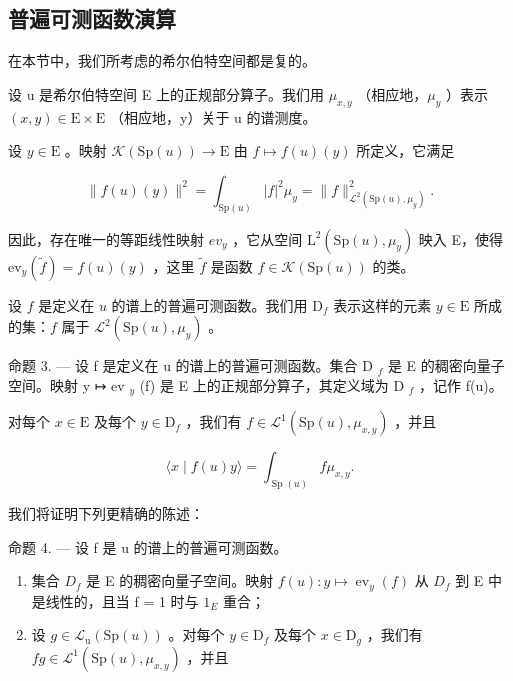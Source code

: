 \subsection{普遍可测函数演算}

在本节中，我们所考虑的希尔伯特空间都是复的。

设 u 是希尔伯特空间 E 上的正规部分算子。我们用 \(\mu_{x,y}\) （相应地，\(\mu_{y}\) ）表示 \((x,y)\in\mathrm{E}\times\mathrm{E}\) （相应地，y）关于 u 的谱测度。

设 \(y \in \mathrm{E}\) 。映射 \(\mathcal{K}(\mathrm{Sp}(u)) \to \mathrm{E}\) 由 \(f \mapsto f(u)(y)\) 所定义，它满足

\[
\| f (u) (y) \| ^ {2} = \int_ {\mathrm{Sp} (u)} | f | ^ {2} \mu_ {y} = \| f \| _ {\mathcal {L} ^ {2} (\mathrm{Sp} (u), \mu_ {y})} ^ {2}.
\]

因此，存在唯一的等距线性映射 \(ev_{y}\) ，它从空间 \(\mathrm{L}^{2}(\mathrm{Sp}(u),\mu_{y})\) 映入 E，使得 \(\mathrm{ev}_{y}(\widetilde{f})=f(u)(y)\) ，这里 \(\widetilde{f}\) 是函数 \(f\in\mathcal{K}(\mathrm{Sp}(u))\) 的类。

设 \(f\) 是定义在 \(u\) 的谱上的普遍可测函数。我们用 \(\mathrm{D}_{f}\) 表示这样的元素 \(y \in \mathrm{E}\) 所成的集：\(f\) 属于 \(\mathcal{L}^{2}(\mathrm{Sp}(u), \mu_{y})\) 。

命题 3. --- 设 f 是定义在 u 的谱上的普遍可测函数。集合 D \(_{f}\) 是 E 的稠密向量子空间。映射 y ↦ ev \(_{y}\) (f) 是 E 上的正规部分算子，其定义域为 D \(_{f}\) ，记作 f(u)。

对每个 \(x \in \mathrm{E}\) 及每个 \(y \in \mathrm{D}_f\) ，我们有 \(f \in \mathcal{L}^1(\mathrm{Sp}(u), \mu_{x,y})\) ，并且

\[
\langle x \mid f (u) y \rangle = \int_ {\operatorname{Sp} (u)} f \mu_ {x, y}.\tag{6}
\]

我们将证明下列更精确的陈述：

命题 4. --- 设 f 是 u 的谱上的普遍可测函数。

\begin{enumerate}
\def\labelenumi{\alph{enumi})}
\item
  集合 \(D_{f}\) 是 E 的稠密向量子空间。映射 \(f(u): y \mapsto \operatorname{ev}_{y}(f)\) 从 \(D_{f}\) 到 E 中是线性的，且当 f = 1 时与 \(1_{E}\) 重合；
\item
  设 \(g \in \mathcal{L}_{\mathrm{u}}(\mathrm{Sp}(u))\) 。对每个 \(y \in \mathrm{D}_f\) 及每个 \(x \in \mathrm{D}_g\) ，我们有 \(fg \in \mathcal{L}^1(\mathrm{Sp}(u), \mu_{x,y})\) ，并且
\end{enumerate}

